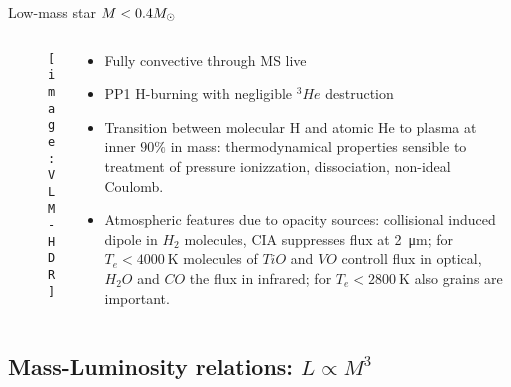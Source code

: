 \begin{frame}{Low-mass star $M<0.4M_{\odot}{}$}
\begin{columns}[T]\begin{column}{0.45\textwidth}
\begin{figure}[!ht]
\texttt{[image: VLM-HDR]}\label{fig:VLM-HDR}
\end{figure}
\end{column}
\begin{column}{0.47\textwidth}
\begin{itemize}
    \item Fully convective through MS live
    \item PP1 H-burning with negligible $^3He$ destruction
    \item Transition between molecular H and atomic He to plasma at inner $90\%$ in mass: thermodynamical properties sensible to treatment of pressure ionizzation, dissociation, non-ideal Coulomb.
    \item Atmospheric features due to opacity sources: collisional induced dipole in $H_2$ molecules, CIA suppresses flux at \SI{2}{\micro\meter}; for $T_e<\SI{4000}{\kelvin}$ molecules of $TiO$ and $VO$ controll flux in optical, $H_2O$ and $CO$ the flux in infrared; for $T_e<\SI{2800}{\kelvin}$ also grains are important.
\end{itemize}
\end{column}\end{columns}
\end{frame}

\subsection{Mass-Luminosity relations: $L\propto M^3$}

